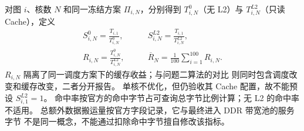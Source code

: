 对图 $i$、核数 $N$ 和同一冻结方案 $\Pi_{i,N}$，分别得到
$T^{0}_{i,N}$（无 L2）与 $T^{L2}_{i,N}$（只读 Cache），定义
\begin{equation}
\begin{aligned}
S^{0}_{i,N}=\frac{T_{i,1}}{T^{0}_{i,N}},\qquad
&S^{L2}_{i,N}=\frac{T_{i,1}}{T^{L2}_{i,N}},\\
R_{i,N}=\frac{T^{0}_{i,N}}{T^{L2}_{i,N}},\qquad
&\overline R_N=\frac1{100}\sum_{i=1}^{100}R_{i,N}.
\end{aligned}
\label{eq:q3-metrics}
\end{equation}
$R_{i,N}$ 隔离了同一调度方案下的缓存收益；与问题二算法的对比
则同时包含调度改变和缓存改变，二者分开报告。
单核不优化，但仍验收其 Cache 配置，故不能预设 $S^{L2}_{i,1}=1$。
命中率按官方的命中字节占可查询总字节比例计算；无 L2 的命中率不适用。
总额外数据搬运量按官方字段记录，它与最终进入 DDR 带宽池的服务字节
不是同一概念，不能通过扣除命中字节擅自修改该指标。

